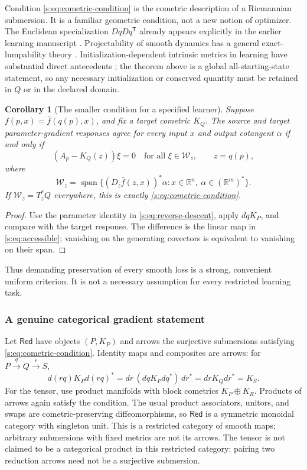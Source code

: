 \documentclass[11pt]{article}
\newtheorem{corollary}[theorem]{Corollary}
\theoremstyle{definition}
\theoremstyle{remark}\newtheorem{remark}[theorem]{Remark}
\newcommand{\R}{\mathbb R}
\newcommand{\Red}{\mathsf{Red}}
\begin{document}
Condition \eqref{s:eq:cometric-condition} is the cometric description of a
Riemannian submersion. It is a familiar geometric condition, not a new
notion of optimizer. The Euclidean specialization $DqDq^{\mathsf T}$ already
appears explicitly in the earlier learning manuscript \cite{LearningNote}.
Projectability of smooth dynamics has a general exact-lumpability theory
\cite{HA}. Initialization-dependent intrinsic metrics in learning have
substantial direct antecedents \cite{MPG}; the theorem above is a global
all-starting-state statement, so any necessary initialization or conserved
quantity must be retained in $Q$ or in the declared domain.

\begin{corollary}[The smaller condition for a specified learner]
\label{s:cor:accessible}
Suppose $f(p,x)=\bar f(q(p),x)$, and fix a target cometric $K_Q$.
The source and target parameter-gradient responses agree for every input
$x$ and output cotangent $\alpha$ if and only if
\begin{equation}\label{s:eq:accessible}
 (A_p-K_Q(z))\xi=0\quad
 \text{for all }\xi\in\mathcal W_z,\qquad z=q(p),
\end{equation}
where
\[
 \mathcal W_z=\operatorname{span}
   \{(D_z\bar f(z,x))^*\alpha:x\in\R^n,\ \alpha\in(\R^m)^*\}.
\]
If $\mathcal W_z=T_z^*Q$ everywhere, this is exactly
\eqref{s:eq:cometric-condition}.
\end{corollary}
\begin{proof}
Use the parameter identity in \eqref{s:eq:reverse-descent}, apply $dqK_P$,
and compare with the target response. The difference is the linear map in
\eqref{s:eq:accessible}; vanishing on the generating covectors is equivalent
to vanishing on their span.
\end{proof}
Thus demanding preservation of every smooth loss is a strong, convenient
uniform criterion. It is not a necessary assumption for every restricted
learning task.

\subsubsection{A genuine categorical gradient statement}
Let $\Red$ have objects $(P,K_P)$ and arrows the surjective submersions
satisfying \eqref{s:eq:cometric-condition}. Identity maps and composites are
arrows: for $P\xrightarrow{q}Q\xrightarrow{r}S$,
\[
 d(rq)K_Pd(rq)^*=dr\,(dqK_Pdq^*)\,dr^*=drK_Qdr^*=K_S.
\]
For the tensor, use product manifolds with block cometrics $K_P\oplus K_R$.
Products of arrows again satisfy the condition. The usual product associators, unitors, and swaps
are cometric-preserving diffeomorphisms, so $\Red$ is a symmetric monoidal
category with singleton unit. This is a restricted category of smooth
maps; arbitrary submersions with fixed metrics are not its arrows.
The tensor is not claimed to be a categorical product in this restricted
category: pairing two reduction arrows need not be a surjective submersion.
\end{document}
